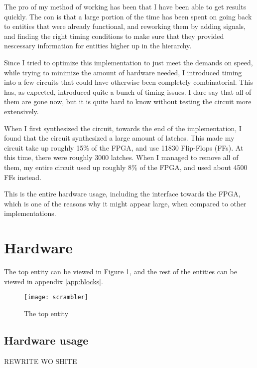 The pro of my method of working has been that I have been able to get 
results quickly. The con is that a large portion of the time has been 
spent on going back to entities that were already functional, and 
reworking them by adding signals, and finding the right timing 
conditions to make sure that they provided nescessary information for 
entities higher up in the hierarchy.

Since I tried to optimize this implementation to just meet the demands 
on speed, while trying to minimize the amount of hardware needed, I 
introduced timing into a few circuits that could have otherwise been 
completely combinatorial. This has, as expected, introduced quite a 
bunch of timing-issues. I dare say that all of them are gone now, but 
it is quite hard to know without testing the circuit more extensively.

When I first synthesized the circuit, towards the end of the 
implementation, I found that the circuit synthesized a large amount of 
latches. This made my circuit take up roughly 15\% of the FPGA, and use 
11830 Flip-Flops (FFs). At this time, there were roughly 3000 latches. 
When I managed to remove all of them, my entire circuit used up roughly 
8\% of the FPGA, and used about 4500 FFs instead.

This is the entire hardware usage, including the interface towards the 
FPGA, which is one of the reasons why it might appear large, when 
compared to other implementations.

\section{Hardware}
The top entity can be viewed in Figure \ref{b:scr}, and the rest of 
the entities can be viewed in appendix \ref{app:blocks}.

\begin{figure}
  \texttt{[image: scrambler]}
  \caption{The top entity}
  \label{b:scr}
\end{figure}

\subsection{Hardware usage}
REWRITE WO SHITE


